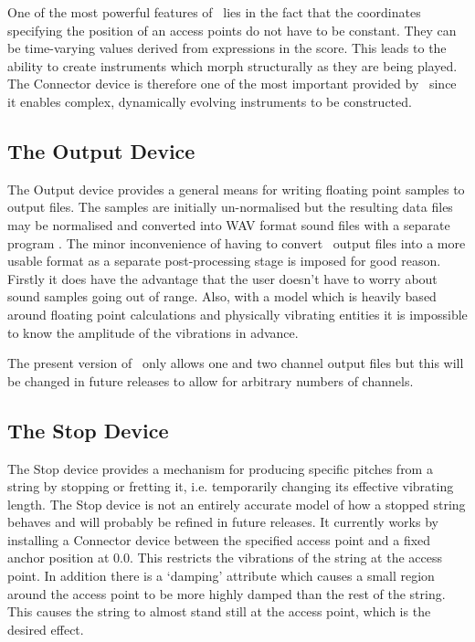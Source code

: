 One of the most powerful features of \tao\ lies in the fact that the
coordinates specifying the position of an access points do not have to be
constant. They can be time-varying values derived from expressions in the
score. This leads to the ability to create instruments which morph
structurally as they are being played. The Connector device is
therefore one of the most important provided by \tao\ since it enables
complex, dynamically evolving instruments to be constructed.

\subsection*{The Output Device}
\label{output_device}
The Output device provides a general means for writing floating point
samples to output files. The samples are initially un-normalised but the 
resulting data files may be normalised and converted into WAV format sound
files with a separate program . The minor inconvenience of
having to convert \tao\ output files into a more usable format as a separate
post-processing stage is imposed for good reason. Firstly it does have the
advantage that the user doesn't have to worry about sound samples going out
of range. Also, with a model which is heavily based around floating point
calculations and physically vibrating entities it is impossible to know the
amplitude of the vibrations in advance.

The present version of \tao\ only allows one and two channel output files but
this will be changed in future releases to allow for arbitrary numbers of
channels.

\subsection*{The Stop Device}
\label{stop_device}
The Stop device provides a mechanism for producing specific pitches from a
string by stopping or fretting  it, i.e. temporarily changing its effective
vibrating length. The Stop device is not an entirely accurate model of
how a stopped string behaves and will probably be refined in future releases.
It currently works by installing a Connector device between
the specified access point and a fixed anchor position at 0.0. This restricts
the vibrations of the string at the access point. In addition there is
a `damping' attribute which causes a small region around the access point to
be more highly damped than the rest of the string. This causes the string to
almost stand still at the access point, which is the desired effect.


